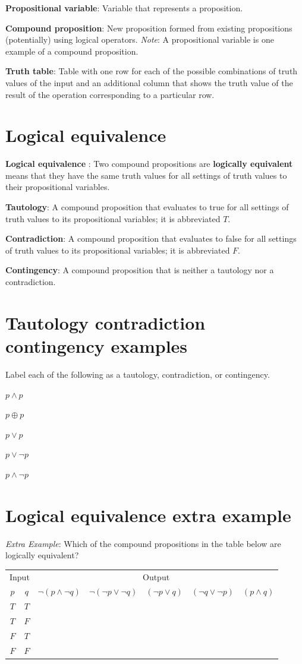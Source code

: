 \documentclass[12pt, oneside]{article}
\begin{document}
{\bf Propositional variable}: Variable that represents a proposition.

{\bf Compound proposition}: New proposition formed from existing propositions (potentially) using logical operators.
{\it Note}: A propositional variable is one example of a compound proposition.

{\bf Truth table}: Table with one row for each of the possible combinations of truth values of the input and 
    an additional column that shows the truth value of the result of the operation corresponding to a particular row.
    
 \vfill
\section*{Logical equivalence}


{\bf Logical equivalence }: Two compound  propositions are {\bf logically  equivalent} means that  they 
have the  same  truth  values for all settings of truth  values to their propositional  variables.

{\bf Tautology}:  A compound proposition that evaluates to true
for all settings of truth  values to its propositional  variables; it is  abbreviated $T$.

{\bf Contradiction}: A compound proposition that  evaluates  to  false 
for  all settings of truth  values to its propositional  variables; it  is abbreviated $F$.

{\bf Contingency}: A compound proposition that is neither a tautology nor a contradiction.
 \vfill
\section*{Tautology contradiction contingency examples}


Label each of the following as a tautology, contradiction, or contingency.

$p \land p$

$p \oplus p$

$p \lor p$

$p \lor \lnot p$

$p \land \lnot p$ \vfill
\section*{Logical equivalence extra example}


{\it Extra Example}: Which of the  compound propositions in the table below are logically equivalent?
\begin{center}
\begin{tabular}{cc||c|c|c|c|c}
\multicolumn{2}{c||}{Input}  & \multicolumn{5}{c}{Output} \\
$p$ & $q$ & $\lnot (p \land \lnot q)$ & $\lnot (\lnot p  \lor \lnot q)$ &  $(\lnot p \lor  q)$
& $(\lnot q \lor \lnot p)$ & $(p \land q)$  \\
\hline
$T$ & $T$ & &&&&\\
$T$ & $F$ & &&&&\\
$F$ & $T$ & &&&&\\
$F$ & $F$ & &&&&\\
\end{tabular}
\end{center} \vfill
\end{document}
